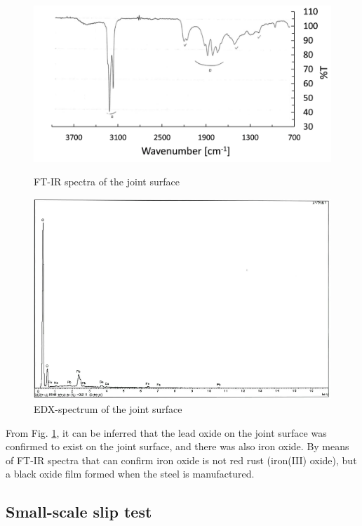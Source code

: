 \begin{figure}[htbp]
    \centering
    \begin{minipage}[t]{0.7\textwidth}
    \includegraphics[width=\linewidth]{imgs/ch3/fig4.png}
    \caption{FT-IR spectra of the joint surface}
    \label{ch3fig4}  
    \end{minipage}
    \begin{minipage}[t]{0.7\textwidth}
    \includegraphics[width=\linewidth]{imgs/ch3/fig5.png}
    \caption{EDX-spectrum of the joint surface}
    \label{ch3fig5}  
    \end{minipage}
\end{figure}

From Fig. \ref{ch3fig5}, it can be inferred that the lead oxide on the joint surface was confirmed to exist on the joint surface, and there was also iron oxide. By means of FT-IR spectra that can confirm iron oxide is not red rust (iron(III) oxide), but a black oxide film formed when the steel is manufactured.


\subsection{Small-scale slip test}

